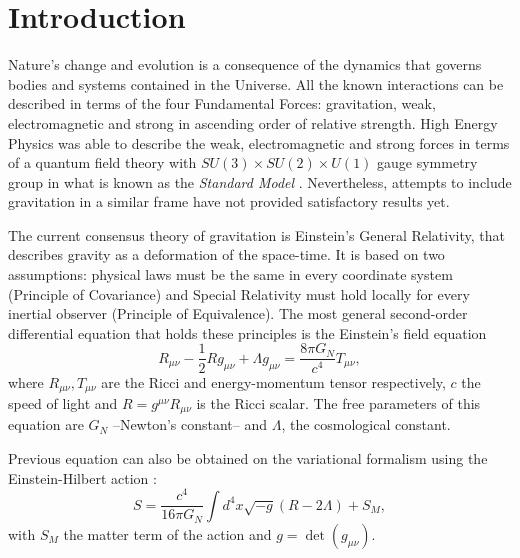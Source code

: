 \chapter{Introduction}
\label{ch:introduction}
Nature's change and evolution is a consequence of the dynamics that governs bodies and systems contained in the Universe. All the known interactions can be described in terms of the four Fundamental Forces: gravitation, weak, electromagnetic and strong in ascending order of relative strength. High Energy Physics was able to describe the weak, electromagnetic and strong forces in terms of a quantum field theory with $SU(3)\times SU(2)\times U(1)$ gauge symmetry group in what is known as the {\it Standard Model} \cite{halzen1984quarks,peskin1995introduction,weinberg1995quantum,weinberg1996quantum,2000hep.ph....1283N}. Nevertheless, attempts to include gravitation in a similar frame have not provided satisfactory results yet.
\newline

The current consensus theory of gravitation is Einstein's General Relativity, that describes gravity as a deformation of the space-time. It is based on two assumptions: physical laws must be the same in every coordinate system (Principle of Covariance) and Special Relativity must hold locally for every inertial observer (Principle of Equivalence). The most general second-order differential equation that holds these principles is the Einstein's field equation \cite{ANDP:ANDP19163540702,1916AnP...354..769E,1917SPAW.......142E,2001LRR.....4....1C}
\begin{equation}
R_{\mu\nu}-\frac{1}{2}Rg_{\mu\nu} + \Lambda g_{\mu\nu} = \frac{8\pi G_N}{c^4}T_{\mu\nu},
\label{eq:einsteinbare}
\end{equation}
where $R_{\mu\nu},T_{\mu\nu}$ are the Ricci and energy-momentum tensor respectively, $c$ the speed of light and $R=g^{\mu\nu}R_{\mu\nu}$ is the Ricci scalar. The free parameters of this equation are $G_N$ --Newton's constant-- and $\Lambda$, the cosmological constant.
\newline

Previous equation can also be obtained on the variational formalism using the Einstein-Hilbert action \cite{Hilbert:1915tx}:
\begin{equation}
S = \frac{c^4}{16\pi G_N}\int d^4x\sqrt{-g}(R-2\Lambda)+S_M,
\label{eq:ehaction}
\end{equation}
with $S_M$ the matter term of the action and $g=\det(g_{\mu\nu})$.

